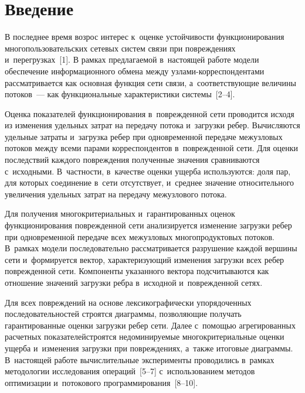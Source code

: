   
\vspace*{-3pt}



\thispagestyle{headings}

\begin{multicols}{2}

\label{st\stat}



\section{Введение}

В последнее время возрос интерес к~оценке устойчивости функционирования 
многопользовательских сетевых систем связи  при повреждениях и~перегрузках~[1]. 
В рамках предлагаемой в~на\-сто\-ящей работе модели  обеспечение информационного 
обмена между уз\-ла\-ми-кор\-рес\-пон\-ден\-та\-ми рас\-смат\-ри\-ва\-ет\-ся как основная функция сети 
связи, а~соответствующие величины потоков~---  как функциональные 
характеристики сис\-те\-мы~[2--4].

Оценка показателей функционирования в~поврежденной сети проводится исходя из 
изменения удельных затрат на передачу потока и~загрузки ребер. Вычисляются 
удельные затраты и~загрузка ребер при одновременной передаче межузловых потоков 
между всеми парами корреспондентов в~поврежденной сети. Для оценки последствий 
каждого повреждения  полученные значения сравниваются с~исходными.  В~частности, 
в~качестве оценки ущерба используются: доля пар, для которых  соединение в~сети  
отсутствует,  и~среднее значение относительного увеличения удельных затрат на 
передачу межузлового потока.

Для получения многокритериальных и~гарантированных оценок функционирования 
поврежденной сети анализируется изменение загрузки ребер при одновременной 
передаче всех межузловых \mbox{многопродуктовых} потоков. В~рамках модели 
последовательно рассматривается разрушение каждой вершины сети и~формируется  
вектор, ха\-рак\-те\-ри\-зу\-ющий  изменения загрузки всех ребер поврежденной сети. 
Компоненты указанного вектора подсчитываются как отношение значений загрузки 
ребра в~исходной и~по\-вреж\-ден\-ной сетях.

Для всех повреждений на основе лексикографически упорядоченных 
последовательностей стро\-ятся диаграммы, позволяющие получать гарантированные 
оценки  загрузки ребер сети. Далее с~по\-мощью  агрегированных расчетных 
показателей\linebreak строятся недоминируемые многокритериальные оценки ущерба и~изменения 
загрузки при по\-вреж\-де\-ни\-ях, а~так\-же  итоговые диаграммы.
В~на\-сто\-ящей работе вы\-чис\-ли\-тель\-ные эксперименты проводились в~рамках методологии 
исследования \mbox{операций}~[5--7] с~использованием методов оптимизации и~потокового 
программирования~[8--10].


\end{multicols}
